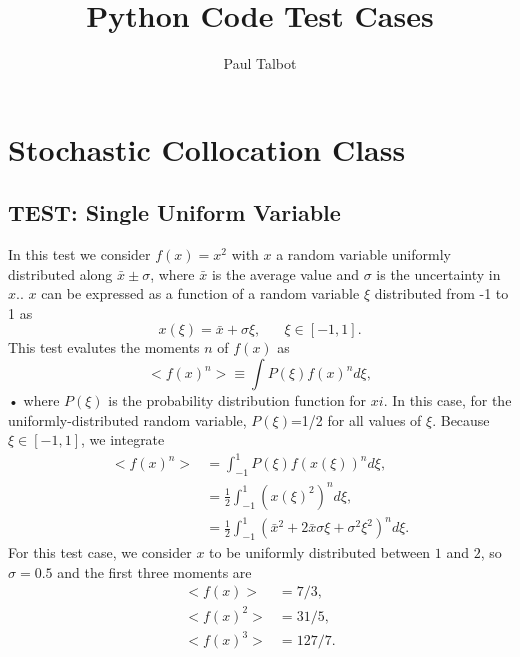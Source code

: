 \documentclass[11pt]{article} %
\title{Python Code Test Cases}
\author{Paul Talbot}
\newcommand{\into}{\ensuremath{\int_{-1}^1}}
\begin{document}
\maketitle

\section{Stochastic Collocation Class}
\subsection{TEST: Single Uniform Variable}
In this test we consider $f(x)=x^2$ with $x$ a random variable uniformly distributed along $\bar x\pm \sigma$, where $\bar x$ is the average value and $\sigma$ is the uncertainty in $x$..  $x$ can be expressed as a function of a random variable $\xi$ distributed from -1 to 1 as
\begin{equation}
x(\xi)=\bar x+\sigma \xi,\hspace{20pt}\xi\in[-1,1].
\end{equation}
This test evalutes the moments $n$ of $f(x)$ as
\begin{equation}
<f(x)^n>\equiv\int P(\xi)f(x)^nd\xi,
\end{equation}•
where $P(\xi)$ is the probability distribution function for $xi$.  In this case, for the uniformly-distributed random variable, $P(\xi)$=1/2 for all values of $\xi$.  Because $\xi\in[-1,1]$, we integrate
\begin{align}
<f(x)^n>&=\into P(\xi)f(x(\xi))^nd\xi,\nonumber\\
  &=\frac{1}{2}\into \left(x(\xi)^2\right)^n d\xi,\nonumber\\
  &=\frac{1}{2}\into \left(\bar x^2+2\bar x\sigma\xi + \sigma^2\xi^2\right)^n d\xi.
\end{align}
For this test case, we consider $x$ to be uniformly distributed between $1$ and $2$, so $\sigma=0.5$ and the first three moments are
\begin{align}
<f(x)>&=7/3,\\
<f(x)^2>&=31/5,\\
<f(x)^3>&=127/7.
\end{align}
\end{document}
